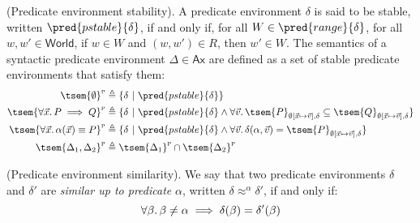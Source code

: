 \begin{defn}
	(Predicate environment stability).
	A predicate environment $\delta$ is said to be stable, written $\pred{pstable}{\delta}$, if and only if, for all $W \in \pred{range}{\delta}$, for all $w, w' \in \mathsf{World}$, if $w \in W$ and $(w, w') \in R$, then $w' \in W$. The semantics of a syntactic predicate environment $\Delta \in \mathsf{Ax}$ are defined as a set of stable predicate environments that satisfy them:
	\begin{align*}
		\tsem{\emptyset}^\textsc{p} &\triangleq \{ \delta\ |\ \pred{pstable}{\delta} \} \\
		\tsem{\forall \vec{x} \ldotp P \implies Q}^\textsc{p} &\triangleq \{ \delta\ |\ \pred{pstable}{\delta} \land \forall \vec{v} \ldotp \tsem{P}_{\emptyset[\vec{x} \mapsto \vec{v}], \delta} \subseteq \tsem{Q}_{\emptyset[\vec{x} \mapsto \vec{v}], \delta} \} \\
		\tsem{\forall \vec{x} \ldotp \alpha(\vec{x}) \equiv P}^\textsc{p} &\triangleq \{ \delta\ |\ \pred{pstable}{\delta} \land \forall \vec{v} \ldotp \delta(\alpha, \vec{v}) = \tsem{P}_{\emptyset[\vec{x} \mapsto \vec{v}], \delta} \} \\
		\tsem{\Delta_1, \Delta_2}^\textsc{p} &\triangleq \tsem{\Delta_1}^\textsc{p} \cap \tsem{\Delta_2}^\textsc{p}
	\end{align*}
\end{defn}

\begin{defn}
	(Predicate environment similarity).
	We say that two predicate environments $\delta$ and $\delta'$ are \emph{similar up to predicate} $\alpha$, written $\delta \approx^\alpha \delta'$, if and only if:
	\[
		\forall \beta \ldotp \beta \neq \alpha \implies \delta(\beta) = \delta'(\beta)
	\]
\end{defn}

